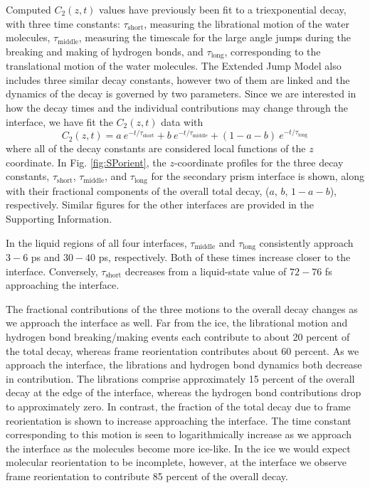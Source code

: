 Computed $C_2(z,t)$ values have previously been fit to a
triexponential decay, with three time constants:
$\tau_\mathrm{short}$, measuring the librational motion of the water
molecules, $\tau_\mathrm{middle}$, measuring the timescale for the
large angle jumps during the breaking and making of hydrogen bonds,
and $\tau_\mathrm{long}$, corresponding to the translational motion of
the water molecules.\cite{Louden2013a} The Extended Jump Model also
includes three similar decay constants, however two of them are linked
and the dynamics of the decay is governed by two parameters. Since we
are interested in how the decay times and the individual contributions
may change through the interface, we have fit the $C_2(z,t)$ data
with
\begin{equation}
  C_{2}(z,t) = a~e^{-t/\tau_\mathrm{short}} + b~e^{-t/\tau_\mathrm{middle}} + 
  (1-a-b)~e^{-t/\tau_\mathrm{long}}
\label{eq:c2}
\end{equation}
where all of the decay constants are considered local functions of the
$z$ coordinate. In Fig. \ref{fig:SPorient}, the $z$-coordinate
profiles for the three decay constants, $\tau_{\mathrm{short}}$,
$\tau_{\mathrm{middle}}$, and $\tau_{\mathrm{long}}$ for the secondary prism interface
is shown, along with their fractional components of the overall total
decay, ($a$, $b$, $1-a-b$), respectively. Similar figures for the
other interfaces are provided in the Supporting Information.

In the liquid regions of all four interfaces, $\tau_\mathrm{middle}$
and $\tau_\mathrm{long}$ consistently approach $3-6$ ps and $30-40$
ps, respectively.  Both of these times increase closer to the
interface.  Conversely, $\tau_\mathrm{short}$ decreases from a
liquid-state value of $72-76$ fs approaching the interface.

The fractional contributions of the three motions to the overall decay
changes as we approach the interface as well. Far from the ice, the
librational motion and hydrogen bond breaking/making events each
contribute to about 20 percent of the total decay, whereas frame
reorientation contributes about 60 percent. As we approach the
interface, the librations and hydrogen bond dynamics both decrease in
contribution. The librations comprise approximately 15 percent of the
overall decay at the edge of the interface, whereas the hydrogen bond
contributions drop to approximately zero. In contrast, the fraction of
the total decay due to frame reorientation is shown to increase
approaching the interface.  The time constant corresponding to this
motion is seen to logarithmically increase as we approach the interface
as the molecules become more ice-like. In the ice we would expect
molecular reorientation to be incomplete, however, at the interface we
observe frame reorientation to contribute 85 percent of the overall
decay.

